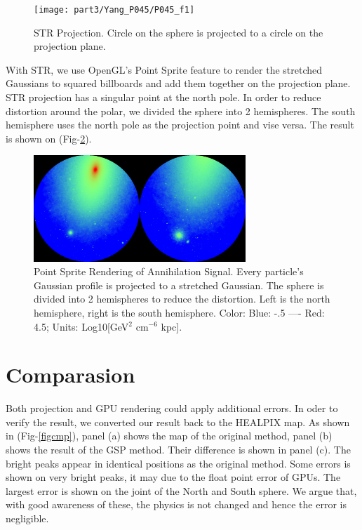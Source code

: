\begin{figure}[htb]
\begin{center}
 \texttt{[image: part3/Yang\_P045/P045\_f1]}
\caption{STR Projection. Circle on the sphere is projected to a circle on the projection plane.\label{figstr}}
\end{center}
\end{figure}

With STR, we use OpenGL's Point Sprite feature to render the stretched Gaussians to squared billboards and add them together on the projection plane. STR projection has a singular point at the north pole. In order to reduce distortion around the polar, we divided the  sphere into 2 hemispheres. The south hemisphere uses the north pole as the projection point and vise versa. The result is shown on (Fig-\ref{figsky}).

\begin{figure}[htb]
\begin{center}
 \includegraphics[width=80mm]{part3/Yang_P045/P045_f2}
\caption{ Point Sprite Rendering of Annihilation Signal. Every particle's Gaussian profile is projected to a stretched Gaussian. The sphere is divided into 2 hemispheres to reduce the distortion. Left is the north hemisphere, right is the south hemisphere. Color: Blue: -.5 ---- Red: 4.5;  Units: Log10[GeV$^2$ cm$^{-6}$ kpc].\label{figsky}}
\end{center}
\end{figure}

\section{Comparasion}
Both projection and GPU rendering could apply additional errors. In oder to verify the result, we converted our result back to the HEALPIX map. As shown in (Fig-\ref{figcmp}), panel (a) shows the map of the original method, panel (b) shows the result of the GSP method. Their difference is shown in panel (c). The bright peaks appear in identical positions as the original method. Some errors is shown on very bright peaks, it may due to the float point error of GPUs. The largest error is shown on the joint of the North and South sphere. We argue that, with good awareness of these, the physics is not changed and hence the error is negligible. 

